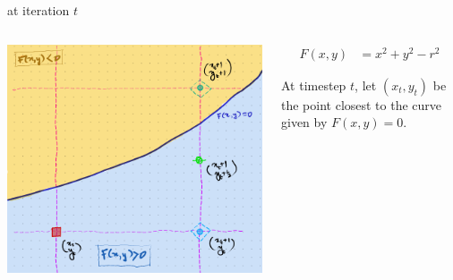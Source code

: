 \documentclass[aspectratio=169,xcolor={dvipsnames,svgnames}]{beamer}
\begin{document}
\begin{frame}[label={sec:orgfeed128}]{at iteration \(t\)}
\begin{columns}
\begin{column}{.4\columnwidth}
\begin{center}
\includegraphics[width=.9\linewidth]{org-download-images/mid-point_algorithm/2024-09-03_22-08-34_screenshot.png}
\end{center}
\end{column}


\begin{column}{.6\columnwidth}
\begin{align*}
  F(x, y) &= x^2 + y^2 - r^2
\end{align*}

At timestep \(t\), let \((x_{t}, y_{t})\) be the point
closest to the curve given by \(F(x,y)=0\).
\end{column}
\end{columns}
\end{frame}
\end{document}
